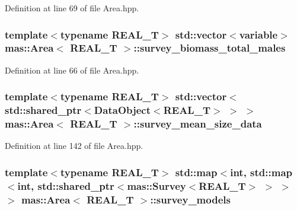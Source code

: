 Definition at line 69 of file Area.\-hpp.

\hypertarget{structmas_1_1_area_a87c205e8c7eb39bc4b50492c7707a310}{
\subsubsection[{survey\-\_\-biomass\-\_\-total\-\_\-males}]{\setlength{\rightskip}{0pt plus 5cm}template$<$typename R\-E\-A\-L\-\_\-\-T$>$ std\-::vector$<${\bf variable}$>$ {\bf mas\-::\-Area}$<$ R\-E\-A\-L\-\_\-\-T $>$\-::survey\-\_\-biomass\-\_\-total\-\_\-males}}\label{structmas_1_1_area_a87c205e8c7eb39bc4b50492c7707a310}


Definition at line 66 of file Area.\-hpp.

\hypertarget{structmas_1_1_area_a2710e056d30edc617f3073d3df19f28f}{
\subsubsection[{survey\-\_\-mean\-\_\-size\-\_\-data}]{\setlength{\rightskip}{0pt plus 5cm}template$<$typename R\-E\-A\-L\-\_\-\-T$>$ std\-::vector$<$std\-::shared\-\_\-ptr$<${\bf Data\-Object}$<$R\-E\-A\-L\-\_\-\-T$>$ $>$ $>$ {\bf mas\-::\-Area}$<$ R\-E\-A\-L\-\_\-\-T $>$\-::survey\-\_\-mean\-\_\-size\-\_\-data}}\label{structmas_1_1_area_a2710e056d30edc617f3073d3df19f28f}


Definition at line 142 of file Area.\-hpp.

\hypertarget{structmas_1_1_area_a06176622d9d6d00ac6725d3f585dad6f}{
\subsubsection[{survey\-\_\-models}]{\setlength{\rightskip}{0pt plus 5cm}template$<$typename R\-E\-A\-L\-\_\-\-T$>$ std\-::map$<$int, std\-::map$<$int, std\-::shared\-\_\-ptr$<${\bf mas\-::\-Survey}$<$R\-E\-A\-L\-\_\-\-T$>$ $>$ $>$ $>$ {\bf mas\-::\-Area}$<$ R\-E\-A\-L\-\_\-\-T $>$\-::survey\-\_\-models}}\label{structmas_1_1_area_a06176622d9d6d00ac6725d3f585dad6f}


